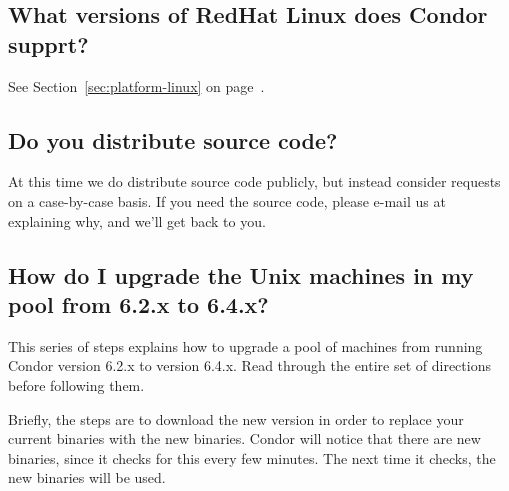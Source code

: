 \subsection*{What versions of RedHat Linux does Condor supprt?}

See Section~\ref{sec:platform-linux} on
page~\pageref{sec:platform-linux}. 

\subsection*{Do you distribute source code?}

At this time we do  distribute source code publicly, but
instead consider requests on a case-by-case basis.
If you need the source code, please e-mail us at
 explaining why, and we'll get back to
you.


\subsection*{How do I upgrade the Unix machines in my pool from 6.2.x to 6.4.x?}

This series of steps explains how to upgrade a pool of machines
from running Condor version 6.2.x to version 6.4.x.
Read through the entire set of directions before following
them.

Briefly, the steps are to download the new version in
order to replace your current binaries with the new binaries.
Condor will notice that there are new binaries, since
it checks for this every few minutes.
The next time it checks, the new binaries will be used.

